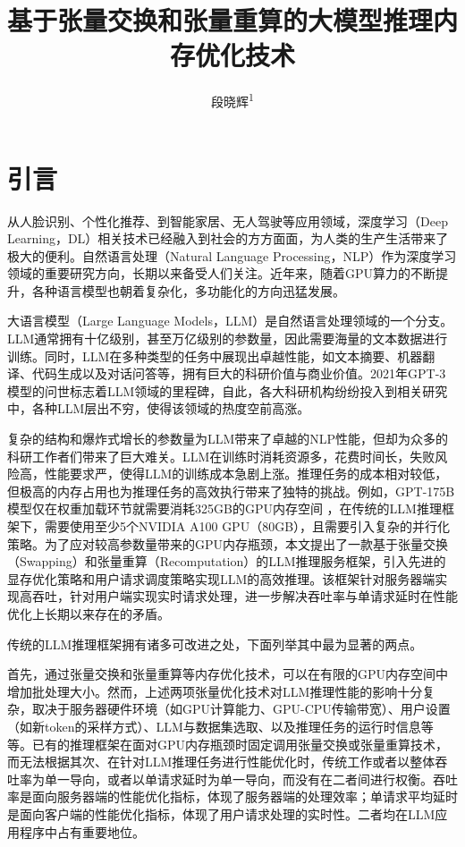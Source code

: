 \documentclass[a4paper, nosysfonts]{hpcchina}
\title{基于张量交换和张量重算的大模型推理内存优化技术}
\author{段晓辉\textsuperscript{1}}
\affiliation{
  \textsuperscript{1} 清华大学，北京 100084
}
\begin{document}
    
\maketitle

\section{引言}
从人脸识别、个性化推荐、到智能家居、无人驾驶等应用领域，深度学习（Deep Learning，DL）相关技术已经融入到社会的方方面面，为人类的生产生活带来了极大的便利。自然语言处理（Natural Language Processing，NLP）作为深度学习领域的重要研究方向，长期以来备受人们关注。近年来，随着GPU算力的不断提升，各种语言模型也朝着复杂化，多功能化的方向迅猛发展。 \par
大语言模型（Large Language Models，LLM）是自然语言处理领域的一个分支。LLM通常拥有十亿级别，甚至万亿级别的参数量，因此需要海量的文本数据进行训练。同时，LLM在多种类型的任务中展现出卓越性能，如文本摘要、机器翻译、代码生成以及对话问答等，拥有巨大的科研价值与商业价值。2021年GPT-3模型的问世标志着LLM领域的里程碑，自此，各大科研机构纷纷投入到相关研究中，各种LLM层出不穷，使得该领域的热度空前高涨。 \par
复杂的结构和爆炸式增长的参数量为LLM带来了卓越的NLP性能，但却为众多的科研工作者们带来了巨大难关。LLM在训练时消耗资源多，花费时间长，失败风险高，性能要求严，使得LLM的训练成本急剧上涨。推理任务的成本相对较低，但极高的内存占用也为推理任务的高效执行带来了独特的挑战。例如，GPT-175B模型仅在权重加载环节就需要消耗325GB的GPU内存空间 ，在传统的LLM推理框架下，需要使用至少5个NVIDIA A100 GPU（80GB），且需要引入复杂的并行化策略。为了应对较高参数量带来的GPU内存瓶颈，本文提出了一款基于张量交换（Swapping）和张量重算（Recomputation）的LLM推理服务框架，引入先进的显存优化策略和用户请求调度策略实现LLM的高效推理。该框架针对服务器端实现高吞吐，针对用户端实现实时请求处理，进一步解决吞吐率与单请求延时在性能优化上长期以来存在的矛盾。 \par
传统的LLM推理框架拥有诸多可改进之处，下面列举其中最为显著的两点。 \par
首先，通过张量交换和张量重算等内存优化技术，可以在有限的GPU内存空间中增加批处理大小。然而，上述两项张量优化技术对LLM推理性能的影响十分复杂，取决于服务器硬件环境（如GPU计算能力、GPU-CPU传输带宽）、用户设置（如新token的采样方式）、LLM与数据集选取、以及推理任务的运行时信息等等。已有的推理框架在面对GPU内存瓶颈时固定调用张量交换或张量重算技术，而无法根据其次、在针对LLM推理任务进行性能优化时，传统工作或者以整体吞吐率为单一导向，或者以单请求延时为单一导向，而没有在二者间进行权衡。吞吐率是面向服务器端的性能优化指标，体现了服务器端的处理效率；单请求平均延时是面向客户端的性能优化指标，体现了用户请求处理的实时性。二者均在LLM应用程序中占有重要地位。 \par
\end{document}
